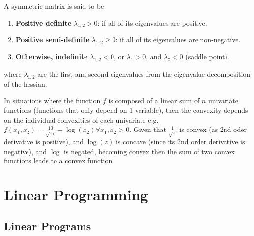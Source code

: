 \documentclass{article}
\begin{document}
A symmetric matrix is said to be
\begin{enumerate}
    \item \textbf{Positive definite} \(\lambda_{1, 2} > 0\): if all of its eigenvalues are positive.
    \item \textbf{Positive semi-definite} \(\lambda_{1, 2} \geq 0\): if all of its eigenvalues are non-negative.
    \item \textbf{Otherwise, indefinite} \(\lambda_{1, 2} < 0\), or \(\lambda_1 > 0\), and \(\lambda_2 < 0\) (saddle point).
\end{enumerate}
where \(\lambda_{1,2}\) are the first and second eigenvalues from the eigenvalue decomposition of the hessian.

In situations where the function \(f\) is composed of a linear sum of \(n\) univariate functions (functions that only depend on 1 variable), then the convexity depends on the individual convexities of each univariate e.g. \(f\left(x_1, x_2\right) = \frac{10}{\sqrt{x_1}} - \log \left(x_2\right) \forall x_1, x_2 > 0\).
Given that \(\frac{1}{\sqrt{x}}\) is convex (as 2nd oder derivative is positive), and \(\log \left(z\right)\) is concave (since its 2nd order derivative is negative), and \(\log\) is negated, becoming convex then the sum of two convex functions leads to a convex function.


\section{Linear Programming}

\subsection{Linear Programs}
\end{document}
